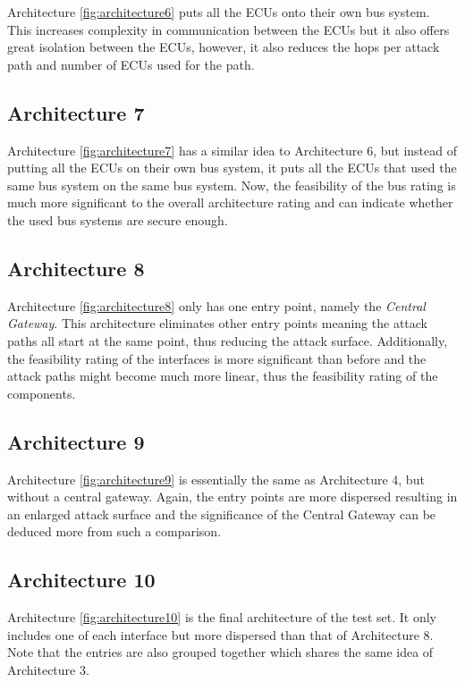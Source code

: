 Architecture \ref{fig:architecture6} puts all the ECUs onto their own bus system. 
This increases complexity in communication between the ECUs but it also offers great isolation between the ECUs, 
however, it also reduces the hops per attack path and number of ECUs used for the path.

\subsection{Architecture 7}
\label{subsec:arch7}

Architecture \ref{fig:architecture7} has a similar idea to Architecture 6, 
but instead of putting all the ECUs on their own bus system, it puts all the ECUs that used the same bus system on the same bus system. 
Now, the feasibility of the bus rating is much more significant to the overall architecture rating and can indicate whether the used bus systems are secure enough.

\subsection{Architecture 8}
\label{subsec:arch8}

Architecture \ref{fig:architecture8} only has one entry point, namely the \textit{Central Gateway}. 
This architecture eliminates other entry points meaning the attack paths all start at the same point, thus reducing the attack surface. 
Additionally, the feasibility rating of the interfaces is more significant than before and the attack paths might become much more linear, 
thus the feasibility rating of the components.

\subsection{Architecture 9}
\label{subsec:arch9}

Architecture \ref{fig:architecture9} is essentially the same as Architecture 4, 
but without a central gateway. Again, the entry points are more dispersed resulting in an enlarged attack surface 
and the significance of the Central Gateway can be deduced more from such a comparison.

\subsection{Architecture 10}
\label{subsec:arch10}

Architecture \ref{fig:architecture10} is the final architecture of the test set. 
It only includes one of each interface but more dispersed than that of Architecture 8. 
Note that the entries are also grouped together which shares the same idea of Architecture 3.